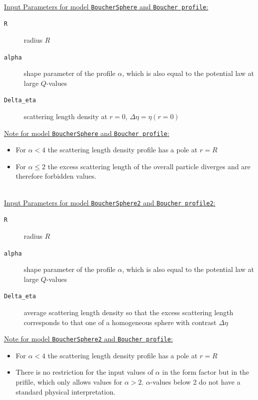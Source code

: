 \vspace{5mm}

\hspace{1pt}\\
\underline{Input Parameters for model \texttt{BoucherSphere} and \texttt{Boucher profile}:}\\
\begin{description}
\item[\texttt{R}] radius $R$
\item[\texttt{alpha}] shape parameter of the profile $\alpha$, which is also equal to the potential law at large $Q$-values
\item[\texttt{Delta\_eta}] scattering length density at $r=0$, $\Delta\eta=\eta(r=0)$
\end{description}

\noindent\underline{Note for model \texttt{BoucherSphere} and \texttt{Boucher profile}:}
\begin{itemize}
\item For $\alpha<4$ the scattering length density profile has a pole at $r=R$
\item For $\alpha \leq 2$ the excess scattering length of the overall particle diverges and are therefore forbidden values.
\end{itemize}

\hspace{1pt}\\
\underline{Input Parameters for model \texttt{BoucherSphere2} and \texttt{Boucher profile2}:}\\
\begin{description}
\item[\texttt{R}] radius $R$
\item[\texttt{alpha}] shape parameter of the profile $\alpha$, which is also equal to the potential law at large $Q$-values
\item[\texttt{Delta\_eta}] average scattering length density so that the excess scattering length corresponds to that one of a homogeneous sphere with contrast $\Delta\eta$
\end{description}

\noindent\underline{Note for model \texttt{BoucherSphere2} and \texttt{Boucher profile}:}
\begin{itemize}
\item For $\alpha<4$ the scattering length density profile has a pole at $r=R$
\item There is no restriction for the input values of $\alpha$ in the form factor but in the prifile, which only allows values for $\alpha>2$.  $\alpha$-values below 2 do not have a standard physical interpretation.
\end{itemize}


